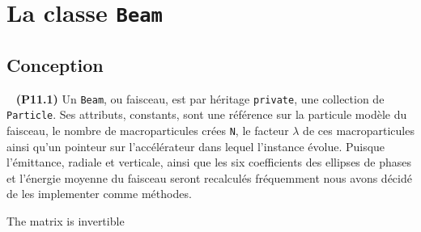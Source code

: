 \documentclass[12pt, letterpaper, twoside]{article}
\newcommand{\T}[1]{\texttt{#1}}
\begin{document}
\section{La classe \T{Beam}}

\subsection{Conception}

\ \linebreak
\noindent \textbf{(P11.1)} Un \T{Beam}, ou faisceau, est par héritage \T{private}, une collection de \T{Particle}. Ses attributs, constants, sont une référence sur la particule modèle du faisceau, le nombre de macroparticules crées \T{N}, le facteur $\lambda$ de ces macroparticules ainsi qu'un pointeur sur l'accélérateur dans lequel l'instance évolue. Puisque l'émittance, radiale et verticale, ainsi que les six coefficients des ellipses de phases et l'énergie moyenne du faisceau seront recalculés fréquemment nous avons décidé de les implementer comme méthodes. 

The matrix is invertible
\end{document}
